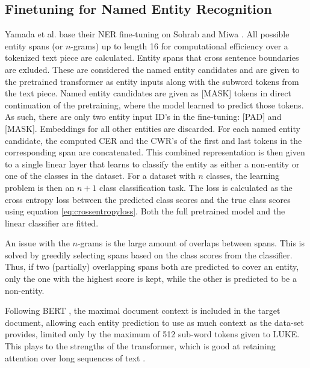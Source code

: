 \documentclass[main.tex]{subfiles}
\begin{document}
\subsection{Finetuning for Named Entity Recognition}
Yamada et al. base their NER fine-tuning on Sohrab and Miwa \cite{sohrab2018nestedner}.
All possible entity spans (or $n$-grams) up to length 16 for computational efficiency over a tokenized text piece are calculated.
Entity spans that cross sentence boundaries are exluded.
These are considered the named entity candidates and are given to the pretrained transformer as entity inputs along with the subword tokens from the text piece.
Named entity candidates are given as [MASK] tokens in direct continuation of the pretraining, where the model learned to predict those tokens.
As such, there are only two entity input ID's in the fine-tuning: [PAD] and [MASK].
Embeddings for all other entities are discarded.
For each named entity candidate, the computed CER and the CWR's of the first and last tokens in the corresponding span are concatenated.
This combined representation is then given to a single linear layer that learns to classify the entity as either a non-entity or one of the classes in the dataset.
For a dataset with $ n $ classes, the learning problem is then an $ n+1 $ class classification task.
The loss is calculated as the cross entropy loss between the predicted class scores and the true class scores using equation \eqref{eq:crossentropyloss}.
Both the full pretrained model and the linear classifier are fitted.

An issue with the $ n $-grams is the large amount of overlaps between spans.
This is solved by greedily selecting spans based on the class scores from the classifier.
Thus, if two (partially) overlapping spans both are predicted to cover an entity, only the one with the highest score is kept, while the other is predicted to be a non-entity.

Following BERT \cite{devlin2019bert}, the maximal document context is included in the target document, allowing each entity prediction to use as much context as the data-set provides, limited only by the maximum of 512 sub-word tokens given to LUKE.
This plays to the strengths of the transformer, which is good at retaining attention over long sequences of text \cite{vaswani2017att}.
\cite{yamada2020luke}
\end{document}
